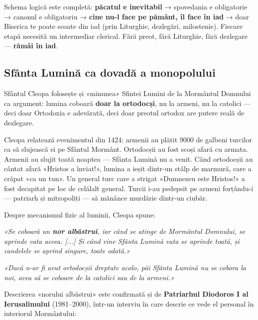 \documentclass[12pt,a4paper,twoside,openany]{book}
\begin{document}
Schema logică este completă: \textbf{păcatul e inevitabil} → spovedania e obligatorie → canonul e obligatoriu → \textbf{cine nu-l face pe pământ, îl face în iad} → doar Biserica te poate scoate din iad (prin Liturghie, dezlegări, milostenie). Fiecare etapă necesită un intermediar clerical. Fără preot, fără Liturghie, fără dezlegare — \textbf{rămâi în iad}.


\subsection{Sfânta Lumină ca dovadă a monopolului}
Sfântul Cleopa folosește și «minunea» Sfintei Lumini de la Mormântul Domnului ca argument: lumina coboară \textbf{doar la ortodocși}, nu la armeni, nu la catolici — deci doar Ortodoxia e adevărată, deci doar preotul ortodox are putere reală de dezlegare.

Cleopa relatează evenimentul din 1424: armenii au plătit 9000 de galbeni turcilor ca să slujească ei pe Sfântul Mormânt. Ortodocșii au fost scoși afară cu armata. Armenii au slujit toată noaptea — Sfânta Lumină nu a venit. Când ortodocșii au cântat afară «Hristos a înviat!», lumina a ieșit dintr-un stâlp de marmură, care a crăpat «ca un tun». Un general turc care a strigat «Dumnezeu este Hristos!» a fost decapitat pe loc de celălalt general. Turcii i-au pedepsit pe armeni forțându-i — patriarh și mitropoliți — să mănânce murdărie dintr-un ciubăr.

Despre mecanismul fizic al luminii, Cleopa spune:


\begin{biblequote}
\textit{«Se coboară un \textbf{nor albăstrui}, iar când se atinge de Mormântul Domnului, se aprinde vata aceea. [...] Și când vine Sfânta Lumină vata se aprinde toată, și candelele se aprind singure, toate odată.»}
\end{biblequote}

\begin{biblequote}
\textit{«Dacă n-ar fi avut ortodocșii dreptate acolo, păi Sfânta Lumină nu se cobora la noi, avea să se coboare de la catolici sau de la armeni.»}
\end{biblequote}
Descrierea «norului albăstrui» este confirmată și de \textbf{Patriarhul Diodoros I al Ierusalimului} (1981–2000), într-un interviu în care descrie ce vede el personal în interiorul Mormântului:
\end{document}
